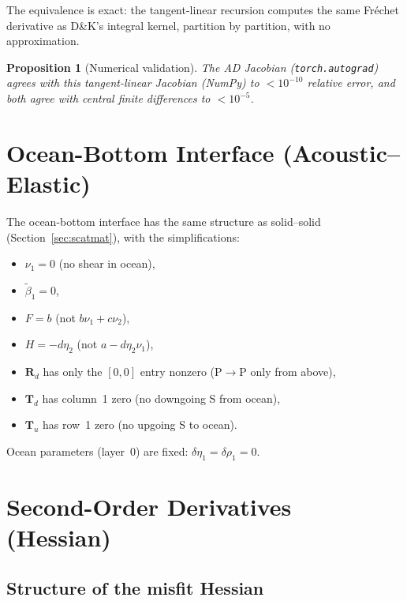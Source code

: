 \documentclass[11pt,a4paper]{article}
\newcommand{\Rd}{\mathbf{R}_d}
\newcommand{\Tu}{\mathbf{T}_u}
\newcommand{\Td}{\mathbf{T}_d}
\theoremstyle{plain}
\newtheorem{proposition}{Proposition}
\theoremstyle{remark}
\begin{document}
\noindent The equivalence is exact: the tangent-linear recursion computes
the same Fréchet derivative as D\&K's integral kernel, partition by
partition, with no approximation.

\begin{proposition}[Numerical validation]
The AD Jacobian (\texttt{torch.autograd}) agrees with this tangent-linear
Jacobian (NumPy) to $< 10^{-10}$ relative error, and both agree with
central finite differences to $< 10^{-5}$.
\end{proposition}

\section{Ocean-Bottom Interface (Acoustic--Elastic)}\label{sec:ocean}

The ocean-bottom interface has the same structure as solid--solid
(Section~\ref{sec:scatmat}), with the simplifications:
\begin{itemize}[nosep]
  \item $\nu_1 = 0$ (no shear in ocean),
  \item $\tilde\beta_1 = 0$,
  \item $F = b$ (not $b\nu_1 + c\nu_2$),
  \item $H = -d\eta_2$ (not $a - d\eta_2\nu_1$),
  \item $\Rd$ has only the $[0,0]$ entry nonzero (P$\to$P only from above),
  \item $\Td$ has column~1 zero (no downgoing S from ocean),
  \item $\Tu$ has row~1 zero (no upgoing S to ocean).
\end{itemize}

\noindent Ocean parameters (layer~0) are fixed:
$\delta\eta_1 = \delta\rho_1 = 0$.

\section{Second-Order Derivatives (Hessian)}\label{sec:hessian}

\subsection{Structure of the misfit Hessian}
\end{document}
